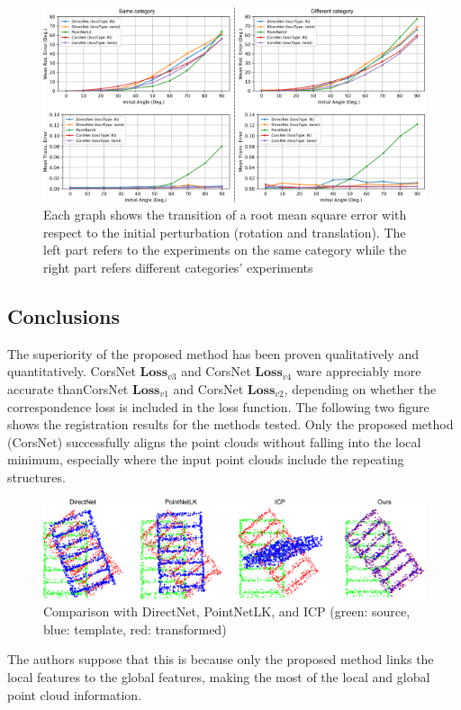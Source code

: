 \begin{figure}[h!]
\centering
\includegraphics[width=0.95\linewidth]{images/mod.png}
\caption{Each graph shows the transition of a root mean square error with respect to the initial perturbation (rotation and translation). The left part refers to the experiments on the same category while the right part refers different categories' experiments}
\end{figure}

\subsection{Conclusions}\label{header-n662}

The superiority of the proposed method has been proven qualitatively and
quantitatively. CorsNet $\boldsymbol{Loss}_{v3}$ and CorsNet
$\boldsymbol{Loss}_{v4}$ ware appreciably more accurate thanCorsNet
$\boldsymbol{Loss}_{v1}$ and CorsNet $\boldsymbol{Loss}_{v2}$,
depending on whether the correspondence loss is included in the loss
function. The following two figure shows the registration results for
the methods tested. Only the proposed method (CorsNet) successfully
aligns the point clouds without falling into the local minimum,
especially where the input point clouds include the repeating
structures.

\begin{figure}[h!]
\centering
\includegraphics[width=0.95\linewidth]{images/registrationres.png}
\caption{Comparison with DirectNet, PointNetLK, and ICP (green: source, blue: template, red: transformed)}
\end{figure}

The authors suppose that this is because only the proposed method links
the local features to the global features, making the most of the local
and global point cloud information.